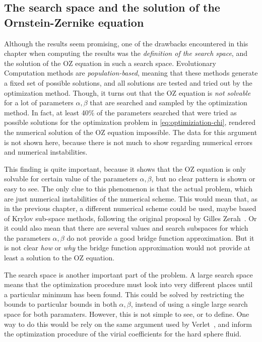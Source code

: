 \subsection{The search space and the solution of the Ornstein-Zernike equation}
Although the results seem promising, one of the drawbacks encountered in this chapter when 
computing the results was the \emph{definition of the search space}, and the solution of 
the OZ equation in such a search space. Evolutionary Computation 
methods are \emph{population-based}, meaning that these methods generate a fixed set of 
possible solutions, and all solutions are tested and tried out by the optimization method. 
Though, it turns out that the OZ equation is \emph{not solvable} for a lot of parameters 
\(\alpha, \beta\) that are searched and sampled by the optimization method. In fact, at 
least 40\% of the parameters searched that were tried as possible solutions for the 
optimization problem in \autoref{eq:optimiziation-chi}, rendered the numerical solution of 
the OZ equation impossible. The data for this argument is not shown here, because there is 
not much to show regarding numerical errors and numerical instabilities.

This finding is quite important, because it shows that the OZ equation is only solvable for 
certain value of the parameters \(\alpha, \beta\), but no clear pattern is shown or easy to 
see. The only clue to this phenomenon is that the actual problem, which are just numerical 
instabilities of the numerical scheme. This would mean that, as in the previous chapter, a 
different numerical scheme could be used, maybe based of Krylov sub-space methods, 
following the original proposal by Gilles Zerah~\cite{zerahEfficientNewtonMethod1985}. Or 
it could also mean that there are several values and search subspaces for which the 
parameters \(\alpha, \beta\) do not provide a good bridge function approximation. But it is 
not clear \emph{how} or \emph{why} the bridge function approximation would not provide at 
least a solution to the OZ equation.

The search space is another important part of the problem. A large search space means that 
the optimization procedure must look into very different places until a particular minimum 
has been found. This could be solved by restricting the bounds to particular bounds in both 
\(\alpha, \beta\), instead of using a single large search space for both paramaters. 
However, this is not simple to see, or to define. One way to do this would be rely on the 
same argument used by Verlet~\cite{verletIntegralEquationsClassical1980}, and inform the 
optimization procedure of the virial coefficients for the hard sphere fluid.

